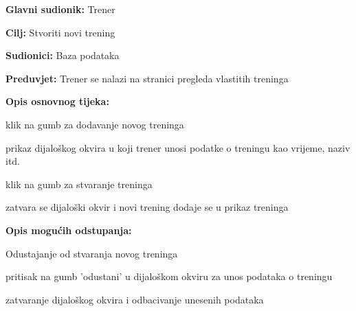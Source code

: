 					
					\noindent {}
					\begin{packed_item}
	
						\item \textbf{Glavni sudionik: }Trener
						\item  \textbf{Cilj: } Stvoriti novi trening
						\item  \textbf{Sudionici: } Baza podataka
						\item  \textbf{Preduvjet: } Trener se nalazi na stranici pregleda vlastitih treninga
						\item  \textbf{Opis osnovnog tijeka:}
						
						\item[] \begin{packed_enum}
	
							\item klik na gumb za dodavanje novog treninga
							\item prikaz dijaloškog okvira u koji trener unosi podatke o treningu kao vrijeme, naziv itd.
							\item klik na gumb za stvaranje treninga
							\item zatvara se dijaloški okvir i novi trening dodaje se u prikaz treninga
							
						\end{packed_enum}
						
						\item  \textbf{Opis mogućih odstupanja:}
						
						\item[] \begin{packed_item}
	
							\item Odustajanje od stvaranja novog treninga
							\item[] \begin{packed_enum}
								
								\item pritisak na gumb 'odustani' u dijaloškom okviru za unos podataka o treningu
								\item zatvaranje dijaloškog okvira i odbacivanje unesenih podataka
								
							\end{packed_enum}
							
						\end{packed_item}
					\end{packed_item}
					
